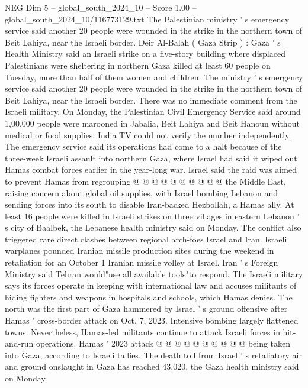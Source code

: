 \begin{textsample}{NEG Dim 5 – global\_south\_2024\_10 – Score 1.00 – global\_south\_2024\_10/116773129.txt}  \label{ex:f5_neg_109}
The Palestinian ministry ' s emergency service said another 20 people were wounded in the strike in the northern town of Beit Lahiya, near the Israeli border.
Deir Al-Balah ( Gaza Strip ) : Gaza ' s Health Ministry said an Israeli strike on a five-story building where displaced Palestinians were sheltering in northern Gaza killed at least 60 people on Tuesday, more than half of them women and children.
The ministry ' s emergency service said another 20 people were wounded in the strike in the northern town of Beit Lahiya, near the Israeli border.
There was no immediate comment from the Israeli military.
On Monday, the Palestinian Civil Emergency Service said around 1,00,000 people were marooned in Jabalia, Beit Lahiya and Beit Hanoun without medical or food supplies.
India TV could not verify the number independently.
The emergency service said its operations had come to a halt because of the three-week Israeli assault into northern Gaza, where Israel had said it wiped out Hamas combat forces earlier in the year-long war.
Israel said the raid was aimed to prevent Hamas from regrouping @ @ @ @ @ @ @ @ @ @ the Middle East, raising concern about global oil supplies, with Israel bombing Lebanon and sending forces into its south to disable Iran-backed Hezbollah, a Hamas ally.
At least 16 people were killed in Israeli strikes on three villages in eastern Lebanon ' s city of Baalbek, the Lebanese health ministry said on Monday.
The conflict also triggered rare direct clashes between regional arch-foes Israel and Iran.
Israeli warplanes pounded Iranian missile production sites during the weekend in retaliation for an October 1 Iranian missile volley at Israel.
Iran ' s Foreign Ministry said Tehran would"use all available tools"to respond.
The Israeli military says its forces operate in keeping with international law and accuses militants of hiding fighters and weapons in hospitals and schools, which Hamas denies.
The north was the first part of Gaza hammered by Israel ' s ground offensive after Hamas ' cross-border attack on Oct. 7, 2023.
Intensive bombing largely flattened towns.
Nevertheless, Hamas-led militants continue to attack Israeli forces in hit-and-run operations.
Hamas ' 2023 attack @ @ @ @ @ @ @ @ @ @ being taken into Gaza, according to Israeli tallies.
The death toll from Israel ' s retaliatory air and ground onslaught in Gaza has reached 43,020, the Gaza health ministry said on Monday.

\end{textsample}
